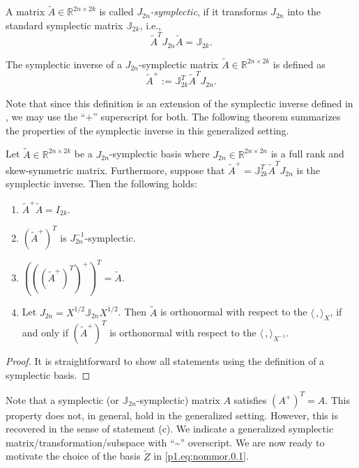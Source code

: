 \begin{definition}
A matrix $\tilde A\in \mathbb R^{2n\times 2k}$ is called \emph{$J_{2n}$-symplectic}, if it transforms $J_{2n}$ into the standard symplectic matrix $\mathbb J_{2k}$, i.e.,
\begin{equation} \label{p1.eq:nommor.0.3}
	\tilde A^T J_{2n} \tilde A = \mathbb J_{2k}.
\end{equation}
\end{definition}

\begin{definition}
The symplectic inverse of a $J_{2n}$-symplectic matrix $\tilde A\in \mathbb R^{2n\times 2k}$ is defined as
\begin{equation} \label{p1.eq:nommor.0.4}
	\tilde A^{+} := \mathbb J_{2k}^T \tilde A^T J_{2n}.
\end{equation}
\end{definition}
Note that since this definition is an extension of the symplectic inverse defined in \cite{doi:10.1137/140978922}, we may use the ``$+$'' superscript for both. The following theorem summarizes the properties of the symplectic inverse in this generalized setting.

\begin{proposition} \label{thm:4.1}
Let $\tilde A\in \mathbb R^{2n\times 2k}$ be a $J_{2n}$-symplectic basis where $J_{2n}\in\mathbb R^{2n\times 2n}$ is a full rank and skew-symmetric matrix. Furthermore, suppose that $\tilde A^{+} = \mathbb{J}_{2k}^T \tilde A^T J_{2n}$ is the symplectic inverse. Then the following holds:
\begin{enumerate}[$\qquad$(a)]
\item $\tilde A^+ \tilde A = I_{2k}$.
\item $(\tilde A^+)^T$ is $J_{2n}^{-1}$-symplectic.
\item $\left(\left(\left(\tilde A^+\right)^T\right)^+\right)^T = \tilde A$.
\item Let $J_{2n}=X^{1/2}\mathbb J_{2n} X^{1/2}$. Then $\tilde A$ is orthonormal with respect to the $\langle\,,\rangle_X$, if and only if $(\tilde A^+)^T$ is orthonormal with respect to the $\langle\,,\rangle_{X^{-1}}$.
\end{enumerate}
\end{proposition}
\begin{proof}
It is straightforward to show all statements using the definition of a symplectic basis.
\end{proof}

Note that a symplectic (or $\mathbb J_{2n}$-symplectic) matrix $A$ satisfies $(A^+)^T = A$. This property does not, in general, hold in the generalized setting. However, this is recovered in the sense of statement (c). We indicate a generalized symplectic matrix/transformation/subspace with ``\textasciitilde'' overscript. We are now ready to motivate the choice of the basis $\tilde Z$ in \eqref{p1.eq:nommor.0.1}.

